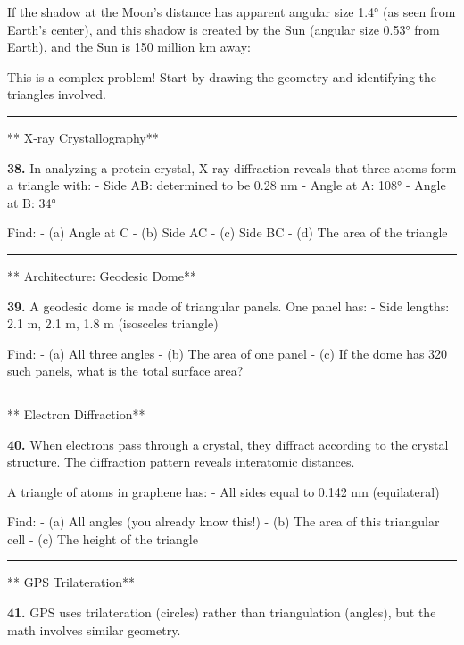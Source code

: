 \documentclass[
  11pt,
]{article}
\begin{document}
If the shadow at the Moon's distance has apparent angular size 1.4° (as
seen from Earth's center), and this shadow is created by the Sun
(angular size 0.53° from Earth), and the Sun is 150 million km away:

This is a complex problem! Start by drawing the geometry and identifying
the triangles involved.

\begin{center}\rule{0.5\linewidth}{0.5pt}\end{center}

** X-ray Crystallography**

\textbf{38.} In analyzing a protein crystal, X-ray diffraction reveals
that three atoms form a triangle with: - Side AB: determined to be 0.28
nm - Angle at A: 108° - Angle at B: 34°

Find: - (a) Angle at C - (b) Side AC - (c) Side BC - (d) The area of the
triangle

\begin{center}\rule{0.5\linewidth}{0.5pt}\end{center}

** Architecture: Geodesic Dome**

\textbf{39.} A geodesic dome is made of triangular panels. One panel
has: - Side lengths: 2.1 m, 2.1 m, 1.8 m (isosceles triangle)

Find: - (a) All three angles - (b) The area of one panel - (c) If the
dome has 320 such panels, what is the total surface area?

\begin{center}\rule{0.5\linewidth}{0.5pt}\end{center}

** Electron Diffraction**

\textbf{40.} When electrons pass through a crystal, they diffract
according to the crystal structure. The diffraction pattern reveals
interatomic distances.

A triangle of atoms in graphene has: - All sides equal to 0.142 nm
(equilateral)

Find: - (a) All angles (you already know this!) - (b) The area of this
triangular cell - (c) The height of the triangle

\begin{center}\rule{0.5\linewidth}{0.5pt}\end{center}

** GPS Trilateration**

\textbf{41.} GPS uses trilateration (circles) rather than triangulation
(angles), but the math involves similar geometry.
\end{document}
